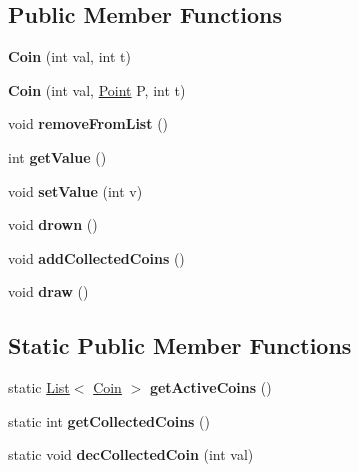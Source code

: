 \subsection*{Public Member Functions}
\begin{DoxyCompactItemize}
\item 
\mbox{\label{class_coin_a09a841eb6b3edf5f4e6143589825077a}} 
{\bfseries Coin} (int val, int t)
\item 
\mbox{\label{class_coin_a3b37ac5e6fe38e884431bc5bafc519fd}} 
{\bfseries Coin} (int val, \mbox{\hyperlink{class_point}{Point}} P, int t)
\item 
\mbox{\label{class_coin_ad553fc0811dc55965a1ed96c7060ed6e}} 
void {\bfseries remove\+From\+List} ()
\item 
\mbox{\label{class_coin_a1e51e734f8cbd7366e4376d9e3439d9e}} 
int {\bfseries get\+Value} ()
\item 
\mbox{\label{class_coin_a7bb558fbb0733956d48fe5c6f6758da9}} 
void {\bfseries set\+Value} (int v)
\item 
\mbox{\label{class_coin_af813e93a2db204d94f981c6151bf6f68}} 
void {\bfseries drown} ()
\item 
\mbox{\label{class_coin_a623a688d85c3ee9c9d7120eb6f7ea364}} 
void {\bfseries add\+Collected\+Coins} ()
\item 
\mbox{\label{class_coin_aac20a35bafe3f05037d32c579e264da2}} 
void {\bfseries draw} ()
\end{DoxyCompactItemize}
\subsection*{Static Public Member Functions}
\begin{DoxyCompactItemize}
\item 
\mbox{\label{class_coin_a36b1c0683e99eb449e9fbd63aff3a8ee}} 
static \mbox{\hyperlink{class_list}{List}}$<$ \mbox{\hyperlink{class_coin}{Coin}} $>$ {\bfseries get\+Active\+Coins} ()
\item 
\mbox{\label{class_coin_abbf4146f1d9f3356f76a9144c8af5767}} 
static int {\bfseries get\+Collected\+Coins} ()
\item 
\mbox{\label{class_coin_a5fed02f0075539657f2bf3ab65ca062f}} 
static void {\bfseries dec\+Collected\+Coin} (int val)
\end{DoxyCompactItemize}
